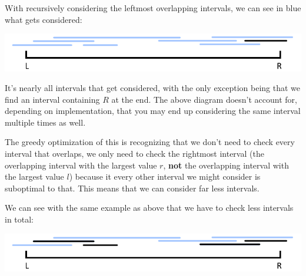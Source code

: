 With recursively considering the leftmost overlapping intervals, we can see in blue what gets considered:

{\centering \includegraphics[width=\textwidth]{images/greedy/interval_1.png}}

It's nearly all intervals that get considered, with the only exception being that we find an interval containing $R$ at the end. The above diagram doesn't account for, depending on implementation, that you may end up considering the same interval multiple times as well.

The greedy optimization of this is recognizing that we don't need to check every interval that overlaps, we only need to check the rightmost interval (the overlapping interval with the largest value $r$, \textbf{not} the overlapping interval with the largest value $l$) because it every other interval we might consider is suboptimal to that. This means that we can consider far less intervals.

We can see with the same example as above that we have to check less intervals in total:

{\centering \includegraphics[width=\textwidth]{images/greedy/interval_2.png}}